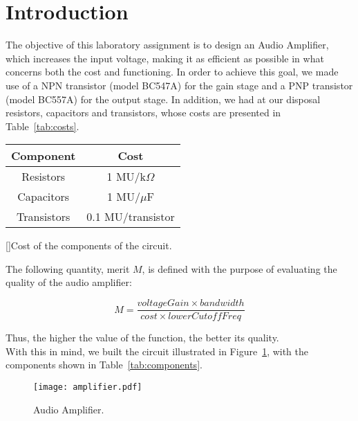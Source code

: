 \section{Introduction}
\label{sec:introduction}

The objective of this laboratory assignment is to design an Audio Amplifier, which increases the input voltage, making it as efficient as possible in what concerns both the cost and functioning. In order to achieve this goal, we made use of a NPN transistor (model BC547A) for the gain stage and a PNP transistor (model BC557A) for the output stage. In addition, we had at our disposal resistors, capacitors and transistors, whose costs are presented in Table~\ref{tab:costs}.

\begin{center}
\begin{tabular}{ | c | c | }
\hline
\textbf{Component} & \textbf{Cost} \\
\hline
Resistors & 1 MU/k$\Omega$ \\  
Capacitors & 1 MU/$\mu$F \\
Transistors & 0.1 MU/transistor \\
\hline   
\end{tabular}
[]{Cost of the components of the circuit.}
\label{tab:costs}
\end{center}

The following quantity, merit $M$, is defined with the purpose of evaluating the quality of the audio amplifier:

\begin{equation}
  M = \frac{voltageGain \times bandwidth}{cost \times lowerCutoffFreq}
\end{equation}

Thus, the higher the value of the function, the better its quality.\\

With this in mind, we built the circuit illustrated in Figure~\ref{fig:amplifier}, with the components shown in Table~\ref{tab:components}.

\begin{figure}[H] \centering
\texttt{[image: amplifier.pdf]}
\caption{Audio Amplifier.}
\label{fig:amplifier}
\end{figure}

